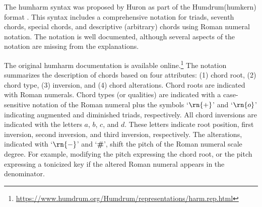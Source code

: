 

The \gls{humharm} syntax was proposed by Huron as part of
the Humdrum(\gls{humkern}) format
\parencite{huron1994humdrum}. This syntax includes a
comprehensive notation for triads, seventh chords, special
chords, and descriptive (arbitrary) chords using Roman
numeral notation. The notation is well documented, although
several aspects of the notation are missing from the
explanations.

The original \gls{humharm} documentation is available
online.\footnote{\href{https://www.humdrum.org/Humdrum/representations/harm.rep.html}{https://www.humdrum.org/Humdrum/representations/harm.rep.html}}
The notation summarizes the description of chords based on
four attributes: (1) chord root, (2) chord type, (3)
inversion, and (4) chord alterations. Chord roots are
indicated with Roman numerals. Chord types (or qualities)
are indicated with a case-sensitive notation of the Roman
numeral plus the symbols `$\rn{+}$' and `$\rn{o}$'
indicating augmented and diminished triads, respectively.
All chord inversions are indicated with the letters $a$,
$b$, $c$, and $d$. These letters indicate root position,
first inversion, second inversion, and third inversion,
respectively. The alterations, indicated with `$\rn{-}$' and
`\textbf{\#}', shift the pitch of the Roman numeral scale
degree. For example, modifying the pitch expressing the
chord root, or the pitch expressing a tonicized key if the
altered Roman numeral appears in the denominator.
